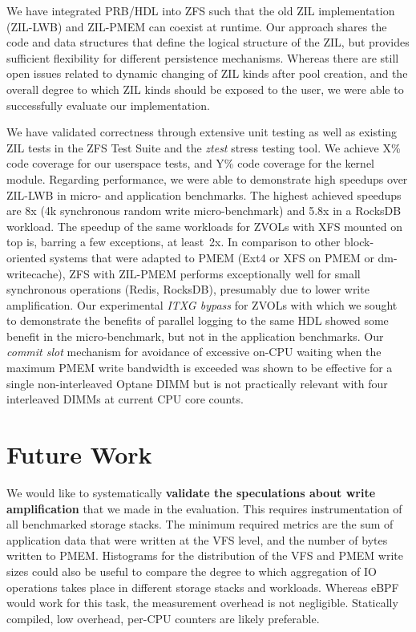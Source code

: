 \documentclass[12pt,a4paper,twoside]{book}
\begin{document}
We have integrated PRB/HDL into ZFS such that the old ZIL implementation (ZIL-LWB) and ZIL-PMEM can coexist at runtime.
Our approach shares the code and data structures that define the logical structure of the ZIL, but provides sufficient flexibility for different persistence mechanisms.
Whereas there are still open issues related to dynamic changing of ZIL kinds after pool creation, and the overall degree to which ZIL kinds should be exposed to the user, we were able to successfully evaluate our implementation.

We have validated correctness through extensive unit testing as well as existing ZIL tests in the ZFS Test Suite and the \textit{ztest} stress testing tool.
We achieve X\% code coverage for our userspace tests, and Y\% code coverage for the kernel module.
Regarding performance, we were able to demonstrate high speedups over ZIL-LWB in micro- and application benchmarks.
The highest achieved speedups are 8x (4k synchronous random write micro-benchmark) and 5.8x in a RocksDB workload.
The speedup of the same workloads for ZVOLs with XFS mounted on top is, barring a few exceptions, at least~2x.
In comparison to other block-oriented systems that were adapted to PMEM (Ext4 or XFS on PMEM or dm-writecache), ZFS with ZIL-PMEM performs exceptionally well for small synchronous operations (Redis, RocksDB), presumably due to lower write amplification.
Our experimental \textit{ITXG bypass} for ZVOLs with which we sought to demonstrate the benefits of parallel logging to the same HDL showed some benefit in the micro-benchmark, but not in the application benchmarks.
Our \textit{commit slot} mechanism for avoidance of excessive on-CPU waiting when the maximum PMEM write bandwidth is exceeded was shown to be effective for a single non-interleaved Optane DIMM but is not practically relevant with four interleaved DIMMs at current CPU core counts.

\section{Future Work}\label{sec:futurework}

We would like to systematically \textbf{validate the speculations about write amplification} that we made in the evaluation.
This requires instrumentation of all benchmarked storage stacks.
The minimum required metrics are the sum of application data that were written at the VFS level, and the number of bytes written to PMEM.
Histograms for the distribution of the VFS and PMEM write sizes could also be useful to compare the degree to which aggregation of IO operations takes place in different storage stacks and workloads.
Whereas eBPF would work for this task, the measurement overhead is not negligible.
Statically compiled, low overhead, per-CPU counters are likely preferable.
\end{document}
